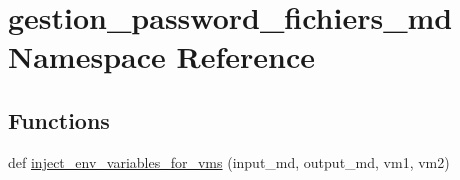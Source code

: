 \hypertarget{namespacegestion__password__fichiers__md}{}\section{gestion\+\_\+password\+\_\+fichiers\+\_\+md Namespace Reference}
\label{namespacegestion__password__fichiers__md}
\subsection*{Functions}
\begin{DoxyCompactItemize}
\item 
def \hyperlink{namespacegestion__password__fichiers__md_aed032129ba105ff89795741aefe220be}{inject\+\_\+env\+\_\+variables\+\_\+for\+\_\+vms} (input\+\_\+md, output\+\_\+md, vm1, vm2)
\end{DoxyCompactItemize}
